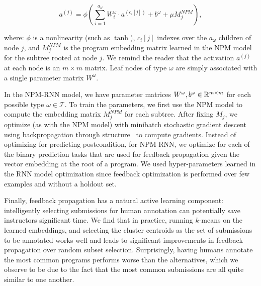 {
\begin{equation}\label{eqn:feedbackRnn}
a^{(j)} = \phi\left( \sum_{i=1}^{a_\omega} W_i^\omega \cdot a^{(c_i[j])} + b^\omega + \mu M^{NPM}_j \right),
\end{equation}
}

where: $\phi$ is a nonlinearity (such as $\tanh$), $c_i[j]$ indexes over
the $a_\omega$ children of node $j$, and $M^{NPM}_j$ is the program embedding matrix learned in the NPM model for the subtree rooted at node $j$.  We remind the reader that the activation $a^{(j)}$ at
each node is an $m\times m$ matrix.
Leaf nodes of type $\omega$
are simply associated with a single parameter matrix
$W^\omega$.


In the NPM-RNN model,
we have parameter matrices $W^\omega, b^\omega \in \mathbb{R}^{m\times m}$ for each possible type 
$\omega \in \mathcal{T}$.
To train the parameters, we
first use the NPM model to compute the 
embedding matrix $M^{NPM}_j$ for each subtree. 
After fixing $M_j$,  we optimize (as with the NPM model)
with minibatch stochastic
gradient descent using backpropagation through structure~\cite{goller1996learning} to compute gradients.
Instead of optimizing for predicting postcondition,
for NPM-RNN, we optimize for each of the binary prediction tasks
that are used for feedback propagation given the vector embedding
at the root of a program. We used hyper-parameters learned in the RNN model optimization since feedback optimization is performed over few examples and without a holdout set.



Finally, feedback propagation has a natural active learning component: 
intelligently selecting submissions for human annotation 
can potentially save instructors significant time.
We find that in practice, running $k$-means on the learned embeddings,
and selecting the cluster centroids as the set of submissions to be annotated works well and leads to significant improvements in feedback propagation
over random subset selection. Surprisingly, having humans annotate the most common programs performs worse than the alternatives, which we
observe to be due to the fact that the most common submissions are all quite similar to one another.


